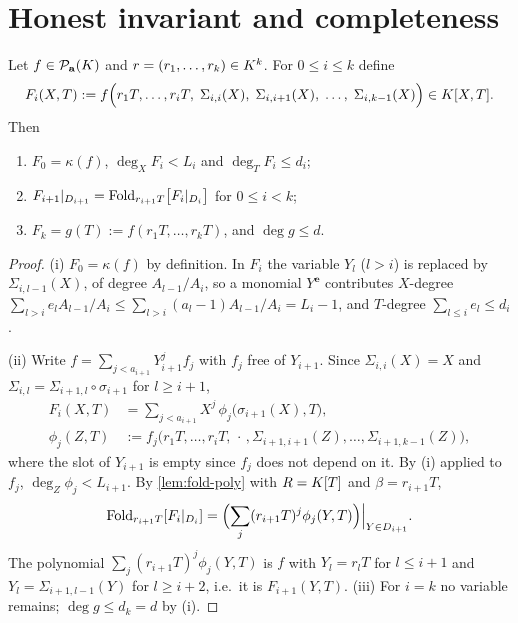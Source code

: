 \section{Honest invariant and completeness}

\begin{proposition}\label{prop:honest}
Let $f\in\mathcal{P}_{\mathbf a}(K)$ and $r=(r_1,\dots,r_k)\in K^k$. For $0\le i\le k$ define
\[
F_i(X,T):=f\Bigl(r_1T,\dots,r_iT,\;\Sigma_{i,i}(X),\;\Sigma_{i,i+1}(X),\;\dots,\;\Sigma_{i,k-1}(X)\Bigr)
\in K[X,T].
\]
Then
\begin{enumerate}[label=\textup{(\roman*)}]
\item $F_0=\kappa(f)$, $\deg_XF_i<L_i$ and $\deg_TF_i\le d_i$;
\item $F_{i+1}|_{D_{i+1}}=\mathrm{Fold}_{r_{i+1}T}\bigl[F_i|_{D_i}\bigr]$ for $0\le i<k$;
\item $F_k=g(T):=f(r_1T,\dots,r_kT)$, and $\deg g\le d$.
\end{enumerate}
\end{proposition}

\begin{proof}
(i) $F_0=\kappa(f)$ by definition. In $F_i$ the variable $Y_l$ ($l>i$) is replaced by
$\Sigma_{i,l-1}(X)$, of degree $A_{l-1}/A_i$, so a monomial $Y^{\mathbf e}$ contributes
$X$-degree $\sum_{l>i}e_lA_{l-1}/A_i\le\sum_{l>i}(a_l-1)A_{l-1}/A_i=L_i-1$, and $T$-degree
$\sum_{l\le i}e_l\le d_i$.

(ii) Write $f=\sum_{j<a_{i+1}}Y_{i+1}^j f_j$ with $f_j$ free of $Y_{i+1}$. Since
$\Sigma_{i,i}(X)=X$ and $\Sigma_{i,l}=\Sigma_{i+1,l}\circ\sigma_{i+1}$ for $l\ge i+1$,
\begin{align*}
F_i(X,T)&=\sum_{j<a_{i+1}}X^j\,\phi_j\bigl(\sigma_{i+1}(X),T\bigr),\\
\phi_j(Z,T)&:=f_j\bigl(r_1T,\dots,r_iT,\,\cdot\,,\Sigma_{i+1,i+1}(Z),\dots,\Sigma_{i+1,k-1}(Z)\bigr),
\end{align*}
where the slot of $Y_{i+1}$ is empty since $f_j$ does not depend on it. By (i) applied to
$f_j$, $\deg_Z\phi_j<L_{i+1}$. By \cref{lem:fold-poly} with $R=K[T]$ and
$\beta=r_{i+1}T$,
\[
\mathrm{Fold}_{r_{i+1}T}[F_i|_{D_i}]=\Bigl(\sum_{j}(r_{i+1}T)^j\phi_j(Y,T)\Bigr)\Big|_{Y\in D_{i+1}} .
\]
The polynomial $\sum_j(r_{i+1}T)^j\phi_j(Y,T)$ is $f$ with $Y_l=r_lT$ for $l\le i+1$ and
$Y_l=\Sigma_{i+1,l-1}(Y)$ for $l\ge i+2$, i.e.\ it is $F_{i+1}(Y,T)$.
(iii) For $i=k$ no variable remains; $\deg g\le d_k=d$ by (i).
\end{proof}

